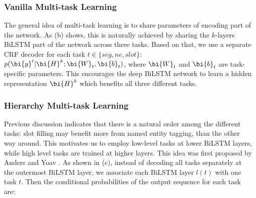 \subsubsection{Vanilla Multi-task Learning}
The general idea of multi-task learning
is to share parameters of encoding part of the network.
As (b) shows,
this is naturally achieved by sharing 
the $k$-layers BiLSTM part of the network across three tasks.
Based on that,
we use a separate CRF decoder for each task $t \in \{seg, ne, slot\}$:
$p(\bi{y}^t|\bi{H}^k;\bi{W}_t, \bi{b}_t)$,
where $\bi{W}_t$ and $\bi{b}_t$ are task-specific parameters.
This encourages the deep BiLSTM network 
to learn a hidden representation $\bi{H}^k$
which benefits all three different tasks.

\subsubsection{Hierarchy Multi-task Learning}
Previous discussion indicates that 
there is a natural order among the different tasks:
slot filling may benefit more from named entity tagging, than the other way around.
This motivates us to employ low-level tasks at lower BiLSTM layers,
while high level tasks are trained at higher layers.
This idea was first proposed by Anders and Yoav \cite{sogaard2016deep}.
As shown in (c), 
instead of decoding all tasks separately at the outermost BiLSTM layer, 
we associate each BiLSTM layer
$l(t)$ with one task $t$.
Then the conditional probabilities of the output sequence for each task are:
